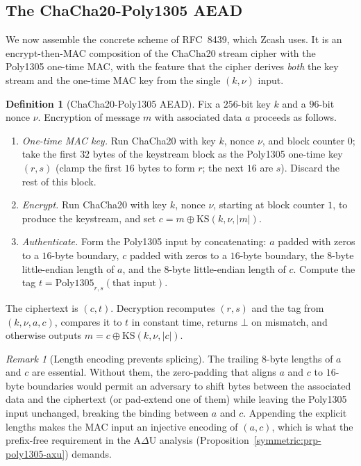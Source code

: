 \documentclass[11pt,a4paper]{article}
\theoremstyle{definition}
\newtheorem{definition}[theorem]{Definition}
\theoremstyle{remark}
\newtheorem{remark}[theorem]{Remark}
\begin{document}
\subsection{The ChaCha20-Poly1305 AEAD}

We now assemble the concrete scheme of RFC~8439, which Zcash uses. It is an encrypt-then-MAC composition of the \textsf{ChaCha20} stream cipher with the \textsf{Poly1305} one-time MAC, with the feature that the cipher derives \emph{both} the key stream and the one-time MAC key from the single \((k, \nu)\) input.

\begin{definition}[ChaCha20-Poly1305 AEAD]\label{symmetric:def-chachapoly}
Fix a \(256\)-bit key \(k\) and a \(96\)-bit nonce \(\nu\). Encryption of message \(m\) with associated data \(a\) proceeds as follows.
\begin{enumerate}
  \item \emph{One-time MAC key.} Run \textsf{ChaCha20} with key \(k\), nonce \(\nu\), and block counter \(0\); take the first \(32\) bytes of the keystream block as the \textsf{Poly1305} one-time key \((r, s)\) (clamp the first \(16\) bytes to form \(r\); the next \(16\) are \(s\)). Discard the rest of this block.
  \item \emph{Encrypt.} Run \textsf{ChaCha20} with key \(k\), nonce \(\nu\), starting at block counter \(1\), to produce the keystream, and set \(c = m \oplus \mathrm{KS}(k,\nu,|m|)\).
  \item \emph{Authenticate.} Form the \textsf{Poly1305} input by concatenating: \(a\) padded with zeros to a \(16\)-byte boundary, \(c\) padded with zeros to a \(16\)-byte boundary, the \(8\)-byte little-endian length of \(a\), and the \(8\)-byte little-endian length of \(c\). Compute the tag \(t = \mathrm{Poly1305}_{r,s}(\text{that input})\).
\end{enumerate}
The ciphertext is \((c, t)\). Decryption recomputes \((r,s)\) and the tag from \((k,\nu,a,c)\), compares it to \(t\) in constant time, returns \(\bot\) on mismatch, and otherwise outputs \(m = c \oplus \mathrm{KS}(k,\nu,|c|)\).
\end{definition}

\begin{remark}[Length encoding prevents splicing]\label{symmetric:rem-length-encoding}
The trailing \(8\)-byte lengths of \(a\) and \(c\) are essential. Without them, the zero-padding that aligns \(a\) and \(c\) to \(16\)-byte boundaries would permit an adversary to shift bytes between the associated data and the ciphertext (or pad-extend one of them) while leaving the \textsf{Poly1305} input unchanged, breaking the binding between \(a\) and \(c\). Appending the explicit lengths makes the MAC input an injective encoding of \((a, c)\), which is what the prefix-free requirement in the A\(\Delta\)U analysis (Proposition~\ref{symmetric:prp-poly1305-axu}) demands.
\end{remark}
\end{document}
